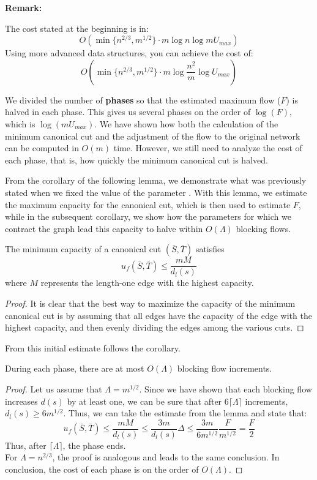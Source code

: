 \textbf{Remark:}
        
        The cost stated at the beginning is in:
        \[O(\min \{n^{2/3}, m^{1/2}\}\cdot m \log n\log m U_{max})\]
        Using more advanced data structures, you can achieve the cost of:
        \[O(\min \{n^{2/3}, m^{1/2}\}\cdot m \log \frac{n^2}{m}\log U_{max})\]


      
        
    We divided the number of \textbf{phases} so that the estimated maximum flow (\( F \)) is halved in each phase.  
    This gives us several phases on the order of \( \log(F) \), which is \( \log(m U_{max}) \).  
    We have shown how both the calculation of the minimum canonical cut and the adjustment of the flow to the original network can be computed in \( O(m) \) time.  
    However, we still need to analyze the cost of each phase, that is, how quickly the minimum canonical cut is halved.
    
    From the corollary of the following lemma, we demonstrate what was previously stated when we fixed the value of the parameter \dlt.  
    With this lemma, we estimate the maximum capacity for the canonical cut, which is then used to estimate \( F \), while in the subsequent corollary, we show how the parameters for which we contract the graph lead this capacity to halve within \( O(\Lambda) \) blocking flows.

    \begin{lemma}
        The minimum capacity of a canonical cut $(\bar{S}, \bar{T})$ satisfies
        \[u_f(\bar{S}, \bar{T})\le \frac{mM}{d_l(s)}\]
        where $M$ represents the length-one edge with the highest capacity.
    \end{lemma}
    \begin{proof}
        It is clear that the best way to maximize the capacity of the minimum canonical cut is by assuming that all edges have the capacity of the edge with the highest capacity, and then evenly dividing the edges among the various cuts.

    \end{proof}

    From this initial estimate follows the corollary.
    \begin{corollary}
    During each phase, there are at most $O(\Lambda)$ blocking flow increments.
    \end{corollary}
    \begin{proof}
        Let us assume that \( \Lambda = m^{1/2} \). Since we have shown that each blocking flow increases \( d(s) \) by at least one, we can be sure that after \( 6\lceil \Lambda \rceil \) increments, \( d_l(s) \geq 6 m^{1/2} \).  
        Thus, we can take the estimate from the lemma and state that:  
        \[
        u_f(\bar{S}, \bar{T}) \le \frac{mM}{d_l(s)} \le \frac{3m}{d_l(s)}\Delta \le \frac{3m}{6m^{1/2}} \frac{F}{m^{1/2}} = \frac{F}{2}
        \]
        Thus, after \( \lceil \Lambda \rceil \), the phase ends.\\  
        For \( \Lambda = n^{2/3} \), the proof is analogous and leads to the same conclusion.  
        In conclusion, the cost of each phase is on the order of \( O(\Lambda) \).
    \end{proof}
    \newpage

